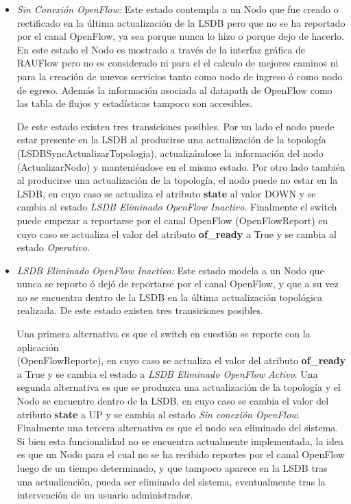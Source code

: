 \begin{itemize}
\item \textit{Sin Conexión OpenFlow:} Este estado contempla a un Nodo que fue creado o rectificado en la \'ultima actualización de la LSDB pero que no se ha reportado por el canal OpenFlow, ya sea porque nunca lo hizo o porque dejo de hacerlo. En este estado el Nodo es mostrado a trav\'es de la interfaz gr\'afica de RAUFlow pero no es considerado ni para el el calculo de mejores caminos ni para la creaci\'on de nuevos servicios tanto como nodo de ingreso \'o como nodo de egreso. Adem\'as la informaci\'on asociada al datapath de OpenFlow como las tabla de flujos y estad\'isticas tampoco son accesibles.

De este estado existen tres transiciones posibles. Por un lado el nodo puede estar presente en la LSDB al producirse una actualizaci\'on de la topolog\'ia\\ (LSDBSyncActualizarTopologia), actualizándose la informaci\'on del nodo \\ (ActualizarNodo) y manteniéndose en el mismo estado. Por otro lado tambi\'en al producirse una actualizaci\'on de la topolog\'ia, el nodo puede no estar en la LSDB, en cuyo caso se actualiza el atributo \textbf{state} al valor DOWN y se cambia al estado \textit{LSDB Eliminado OpenFlow Inactivo}. Finalmente el switch puede empezar a reportarse por el canal OpenFlow (OpenFlowReport) en cuyo caso se actualiza el valor del atributo \textbf{of\_ready} a True y se cambia al estado \textit{Operativo}.  

\item \textit{LSDB Eliminado OpenFlow Inactivo:} Este estado modela a un Nodo que nunca se reporto \'o dej\'o de reportarse por el canal OpenFlow, y que a su vez no se encuentra dentro de la LSDB en la \'ultima actualizaci\'on topol\'ogica realizada. De este estado existen tres transiciones posibles.

Una primera alternativa es que el switch en cuesti\'on se reporte con la aplicaci\'on \\  
 (OpenFlowReporte), en cuyo caso se actualiza el valor del atributo \textbf{of\_ready} a True y se cambia el estado a \textit{LSDB Eliminado OpenFlow Activo}. Una segunda alternativa es que se produzca una actualizaci\'on de la topolog\'ia y el Nodo se encuentre dentro de la LSDB, en cuyo caso se cambia el valor del atributo \textbf{state} a UP y se cambia al estado \textit{Sin conexión OpenFlow}. Finalmente una tercera alternativa es que el nodo  sea eliminado del sistema. Si bien esta funcionalidad no se encuentra actualmente implementada, la idea es que un Nodo para el cual no se ha recibido reportes por el canal OpenFlow luego de un tiempo determinado, y que tampoco aparece en la LSDB tras una actualicaci\'on, pueda ser eliminado del sistema, eventualmente tras la intervenci\'on de un usuario administrador.
  
\end{itemize}

